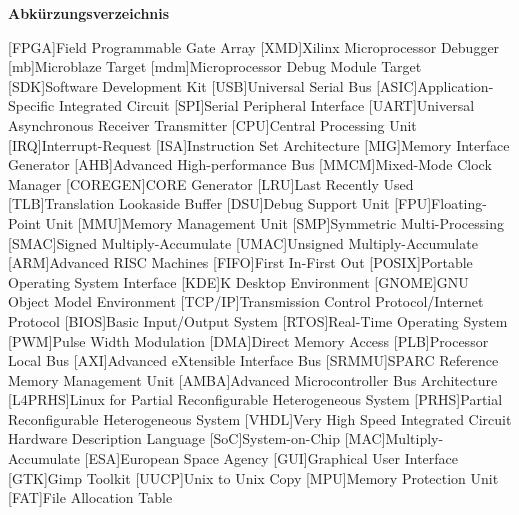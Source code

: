 
{\textbf{Abkürzungsverzeichnis}}

\begin{acronym}[Bash]
 [FPGA]{Field Programmable Gate Array}
 [XMD]{Xilinx Microprocessor Debugger}
 [mb]{Microblaze Target}
 [mdm]{Microprocessor Debug Module Target}
 [SDK]{Software Development Kit}
 [USB]{Universal Serial Bus}
 [ASIC]{Application-Specific Integrated Circuit}
 [SPI]{Serial Peripheral Interface}
 [UART]{Universal Asynchronous Receiver Transmitter}
 [CPU]{Central Processing Unit}
 [IRQ]{Interrupt-Request}
 [ISA]{Instruction Set Architecture}
 [MIG]{Memory Interface Generator}
 [AHB]{Advanced High-performance Bus}
 [MMCM]{Mixed-Mode Clock Manager}
 [COREGEN]{CORE Generator}
  [LRU]{Last Recently Used}
  [TLB]{Translation Lookaside Buffer}
  [DSU]{Debug Support Unit}
  [FPU]{Floating-Point Unit}
 [MMU]{Memory Management Unit}
  [SMP]{Symmetric Multi-Processing}
 [SMAC]{Signed Multiply-Accumulate}
  [UMAC]{Unsigned Multiply-Accumulate}
 [ARM]{Advanced RISC Machines}
 [FIFO]{First In-First Out}
 [POSIX]{Portable Operating System Interface}
 [KDE]{K Desktop Environment}
 [GNOME]{GNU Object Model Environment}
  [TCP/IP]{Transmission Control Protocol/Internet Protocol}
[BIOS]{Basic Input/Output System}
 [RTOS]{Real-Time Operating System}
 [PWM]{Pulse Width Modulation}
  [DMA]{Direct Memory Access}
 [PLB]{Processor Local Bus}
 [AXI]{Advanced eXtensible Interface Bus}
[SRMMU]{SPARC Reference Memory Management Unit}
 [AMBA]{Advanced Microcontroller Bus Architecture}
  [L4PRHS]{Linux for Partial Reconfigurable Heterogeneous System}
   [PRHS]{Partial Reconfigurable Heterogeneous System}
[VHDL]{Very High Speed Integrated Circuit Hardware Description Language}
[SoC]{System-on-Chip}
[MAC]{Multiply-Accumulate}
 [ESA]{European Space Agency}
 [GUI]{Graphical User Interface}
 [GTK]{Gimp Toolkit}
 [UUCP]{Unix to Unix Copy}
 [MPU]{Memory Protection Unit}
  [FAT]{File Allocation Table}

\end{acronym}
